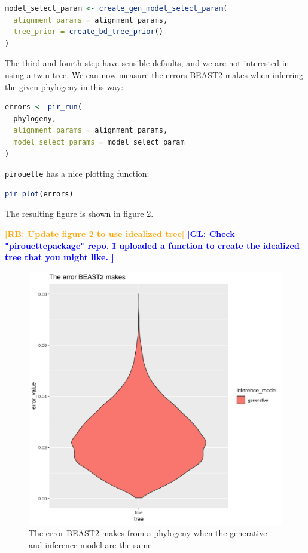 \documentclass{article}
\newcommand{\giovanni}[1]{\textcolor{blue}{\textbf{[GL: #1]}}}
\newcommand{\richel}[1]{\textcolor{orange}{\textbf{[RB: #1]}}}
\begin{document}
\begin{lstlisting}[language=R, floatplacement=H, frame=single]
model_select_param <- create_gen_model_select_param(
  alignment_params = alignment_params,
  tree_prior = create_bd_tree_prior()
)
\end{lstlisting}

The third and fourth step have sensible defaults, and we are not
interested in using a twin tree. We can now measure the errors BEAST2
makes when inferring the given phylogeny in this way:

\begin{lstlisting}[language=R, floatplacement=H, frame=single]
errors <- pir_run(
  phylogeny,
  alignment_params = alignment_params,
  model_select_params = model_select_param
)
\end{lstlisting}

\verb;pirouette; has a nice plotting function:

\begin{lstlisting}[language=R, floatplacement=H, frame=single]
pir_plot(errors)
\end{lstlisting}

The resulting figure is shown in figure 2.

\richel{Update figure 2 to use idealized tree}
\giovanni{
  Check "pirouettepackage" repo. 
  I uploaded a function to create the idealized tree that you might like.
}

\begin{figure}[h]
  \includegraphics[width=\textwidth]{figure_2.png}
  \caption{
    The error BEAST2 makes from a phylogeny 
    when the generative and inference model are the same
  }
\end{figure}
\end{document}

